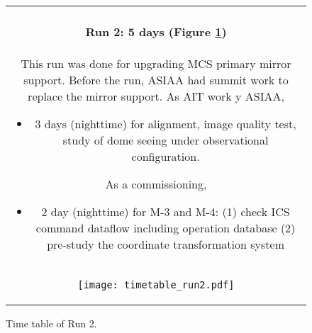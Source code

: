 \begin{figure}[!ht]
\begin{center}
\begin{tabular}{c}
\begin{minipage}{0.95\hsize}
\paragraph{Run 2: 5 days (Figure \ref{fig:run2})}
This run was done for upgrading MCS primary mirror support. 
Before the run, ASIAA had summit work to replace the mirror support. 
As AIT work y ASIAA,
	\begin{itemize}
 	\item 3 days (nighttime) for alignment, image quality test, study of dome seeing under observational configuration.
	\end{itemize}
As a commissioning,
	\begin{itemize}
 	\item 2 day (nighttime) for M-3 and M-4: 
	(1) check ICS command dataflow including operation database
	(2) pre-study the coordinate transformation system
	\end{itemize}
\end{minipage} \\
\begin{minipage}{0.8\hsize}
	\begin{center}
	\vspace*{5mm}
	\texttt{[image: timetable\_run2.pdf]}
	\end{center}
	\vspace*{-5mm}
	\caption{Time table of Run 2.}
	\label{fig:run2}
\end{minipage}
\end{tabular}
\end{center}
\end{figure}

